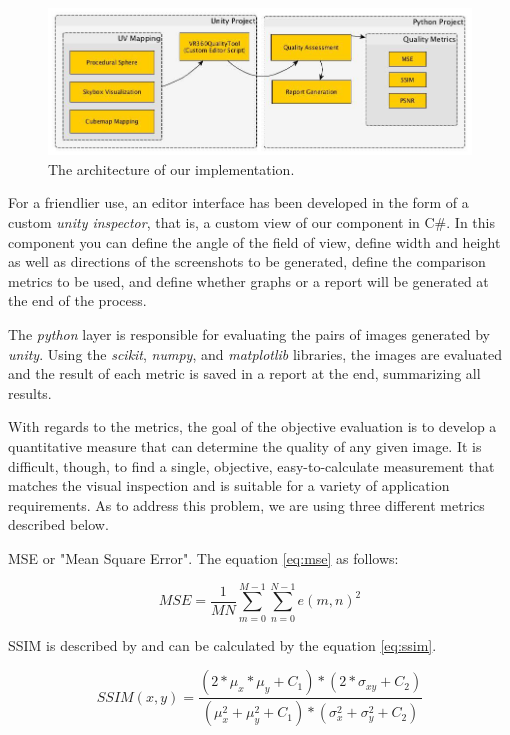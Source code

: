 \documentclass[12pt]{article}
\begin{document}
\begin{figure}[ht]
\centering
\includegraphics[width=\textwidth]{images/tool_arch_en.jpg}
\caption{The architecture of our implementation.}
\label{fig:toolarch}
\end{figure}

For a friendlier use, an editor interface has been developed in the form of a custom \textit{unity inspector}, that is, a custom view of our component in C\#. In this component you can define the angle of the field of view, define width and height as well as directions of the screenshots to be generated, define the comparison metrics to be used, and define whether graphs or a report will be generated at the end of the process.

The \textit{python} layer is responsible for evaluating the pairs of images generated by \textit{unity}. Using the \textit{scikit}, \textit{numpy}, and \textit{matplotlib} libraries, the images are evaluated and the result of each metric is saved in a report at the end, summarizing all results. 

With regards to the metrics, the goal of the objective evaluation is to develop a quantitative measure that can determine the quality of any given image. It is difficult, though, to find a single, objective, easy-to-calculate measurement that matches the visual inspection and is suitable for a variety of application requirements. As to address this problem, we are using three different metrics described below.

MSE or "Mean Square Error". The equation \ref{eq:mse} as follows:

\begin{equation}
MSE=\frac{1}{MN}\sum_{m=0}^{M-1}{\sum_{n=0}^{N-1}{e(m,n)^2}}
\label{eq:mse}
\end{equation}

SSIM is described by \cite{wang2004image} and can be calculated by the equation \ref{eq:ssim}.

\begin{equation}
SSIM(x,y)=\frac{(2*\mu_x*\mu_y+C_1)*(2*\sigma_{xy}+C_2)}{(\mu^2_x+\mu^2_y+C_1)*(\sigma^2_x+\sigma^2_y+C_2)}
\label{eq:ssim}
\end{equation}
\end{document}
